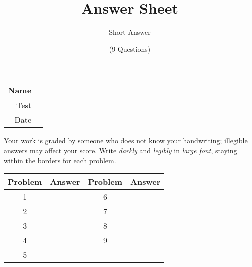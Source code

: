 \documentclass[a4paper, 12pt]{article}
\title{Answer Sheet}
\author{Short Answer}
\date{(9 Questions)}
\begin{document}
\maketitle

\begin{center}
\begin{tabular}{|r|r|}
\hline
	\hspace{3em} Name & \hspace{30em} \\\hline
	Test & \qquad \\ \hline
	Date & \qquad \\ \hline
\end{tabular}
\end{center}

Your work is graded by someone who does not know your handwriting; illegible answers may affect your score. Write \emph{darkly} and \emph{legibly} in \emph{large font}, staying within the borders for each problem.

\begin{center}
\begin{tabularx}{\textwidth}{|c|l|c|X|}\hline
	Problem & Answer & Problem & Answer \\\hline
	1 & \hspace{13.45em} & 6 & \\\hline
	2 & & 7 & \\\hline
	3 & & 8 & \\\hline
	4 & & 9 & \\\hline
	5 & &  & \\\hline
\end{tabularx}
\end{center}
\end{document}
